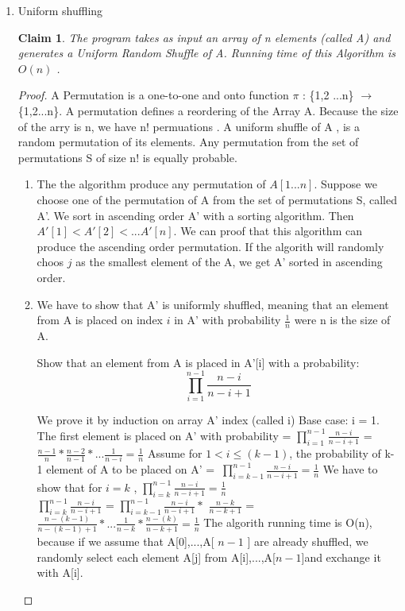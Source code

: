 \documentclass[11pt]{article}
\newtheorem{claim}[theorem]{Claim}
\begin{document}
\begin{enumerate}
\item Uniform shuffling




\begin{claim} 
The program takes as input an array of n elements (called A)  and generates a Uniform Random Shuffle of A. Running time of this Algorithm is $O(n)$ .
\end{claim}
\begin{proof}
A Permutation is a one-to-one and onto function $\pi$ : \{1,2 ...n\} $\rightarrow$ \{1,2...n\}. A permutation defines a reordering of the Array A. Because the size of the arry is n, we have n! permuations . A uniform shuffle of A , is a random permutation of its elements. Any permutation from the set of permutations S of size n! is equally probable.
\begin{enumerate}
\item The the algorithm produce any permutation of $A [ 1...n]$. 
Suppose we choose one of the permutation of A from the set of permutations S, called A'. We sort in ascending order A' with a sorting algorithm. Then $A'[1] < A'[2] <... A'[n]$. We can proof that this algorithm can produce the ascending order permutation. If the algorith will randomly choos $j$ as the smallest element of the A, we get A' sorted in ascending order.



\item We have to show that A' is uniformly shuffled, meaning that an element from A  is placed on index $i$ in  A' with probability $\frac{1}{n}$ were n is the size of A.


Show that an element from A is placed in A'[i] with a probability: 
\begin{equation*}
 \prod_{i=1}^{n-1} \frac{n-i}{n-i+1}
\end{equation*}

We prove it by induction on array A' index (called i)
\newline
Base case: i = 1.
\newline
The first element is placed on A' with probability = $ \prod_{i=1}^{n-1} \frac{n-i}{n-i+1}$  =  
 $\frac{n-1}{n} * \frac{n-2}{n-1}* ... \frac{1}{n-i} = \frac{1}{n}$  
Assume for $  1 <  i \leq (k-1)  $, the probability of k-1 element of A to be placed on A' =  $\ \prod_{i=k-1}^{n-1} \frac{n-i}{n-i+1} = \frac{1}{n}$ 
\newline
We have to show that for $i = k$ ,  $ \prod_{i=k}^{n-1} \frac{n-i}{n-i+1} = \frac{1}{n}$  \\
$ \prod_{i=k}^{n-1} \frac{n-i}{n-i+1}$ = $\prod_{i=k-1}^{n-1} \frac{n-i}{n-i+1}*$  $ \frac{n-k}{n-k+1}$ = $\frac{n-(k-1)}{n-(k-1)+1} * ...  \frac{1}{n-k} * \frac{n-(k)}{n-k+1}  = \frac{1}{n}$ \newline
The algorith running time is O(n), because if we assume that A[0],...,A[ $n-1$ ] are already shuffled, we randomly select each  element A[j] from  A[i],...,A[$n-1$]and exchange it with A[i]. 


\end{enumerate}
\end{proof}
\end{enumerate}
\end{document}
